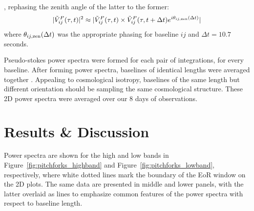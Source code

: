 \documentclass[twocolumn, trackchanges]{aastex61}
\begin{document}
, rephasing the zenith angle of the latter to the former:
\begin{equation}
 | \tilde{V}_{ij}^{P}(\tau, t) |^2 \approx | \tilde{V}_{ij}^{P}(\tau, t) \times \tilde{V}_{ij}^{P}(\tau, t+\Delta t)e^{i\theta_{ij,\rm zen}(\Delta t)}|
\end{equation}
where $\theta_{ij,\rm zen}(\Delta t)$ was the appropriate phasing for baseline $ij$ and $\Delta t = 10.7$ seconds.

Pseudo-stokes power spectra were formed for each pair of integrations, for every baseline. After forming power spectra, baselines of identical lengths were averaged together .  Appealing to cosmological isotropy, baselines of the same length but different orientation should be sampling the same cosmological structure. These 2D power spectra were averaged over our 8 days of observations. 

\section{Results \& Discussion}
\label{sec:results}


Power spectra are shown for the high and low bands in Figure~\ref{fig:pitchforks_highband} and Figure~\ref{fig:pitchforks_lowband}, respectively, where white dotted lines mark the boundary of the EoR window on the 2D plots.  The same data are presented in middle and lower panels, with the latter overlaid as lines to emphasize common features of the power spectra with respect to baseline length. 
\end{document}
